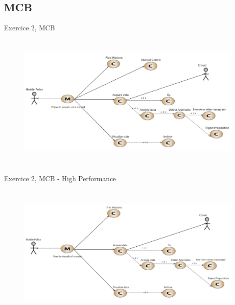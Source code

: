 \documentclass[aspectratio=1610]{beamer}
\begin{document}
    \subsection{MCB}
    \begin{frame}{Exercice 2, MCB}
        \begin{figure}[H]
            \centering
            \includegraphics[width=\textwidth, height=6.75cm, keepaspectratio]{./images/EX2/CSC_5RO08_TA_EX2_MCB_Orginal.jpg}
        \end{figure}
    \end{frame}
    \begin{frame}{Exercice 2, MCB - High Performance}
        \begin{figure}[H]
            \centering
            \includegraphics[width=\textwidth, height=6.75cm, keepaspectratio]{./images/EX2/CSC_5RO08_TA_EX2_MCB_High.jpg}
        \end{figure}
    \end{frame}
\end{document}
